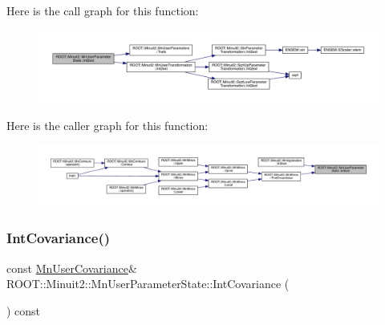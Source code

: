 Here is the call graph for this function\+:\nopagebreak
\begin{figure}[H]
\begin{center}
\leavevmode
\includegraphics[width=350pt]{d3/de0/classROOT_1_1Minuit2_1_1MnUserParameterState_a4ade4b298d85f6192ffa7d7723aa5b97_cgraph}
\end{center}
\end{figure}
Here is the caller graph for this function\+:\nopagebreak
\begin{figure}[H]
\begin{center}
\leavevmode
\includegraphics[width=350pt]{d3/de0/classROOT_1_1Minuit2_1_1MnUserParameterState_a4ade4b298d85f6192ffa7d7723aa5b97_icgraph}
\end{center}
\end{figure}
\mbox{\label{classROOT_1_1Minuit2_1_1MnUserParameterState_ad4b67f98845868977a7b7d99c8ffbe2d}} 
\subsubsection{\texorpdfstring{IntCovariance()}{IntCovariance()}\hspace{0.1cm}{\footnotesize\ttfamily [1/2]}}
{\footnotesize\ttfamily const \mbox{\hyperlink{classROOT_1_1Minuit2_1_1MnUserCovariance}{Mn\+User\+Covariance}}\& R\+O\+O\+T\+::\+Minuit2\+::\+Mn\+User\+Parameter\+State\+::\+Int\+Covariance (\begin{DoxyParamCaption}{ }\end{DoxyParamCaption}) const\hspace{0.3cm}{\ttfamily [inline]}}


